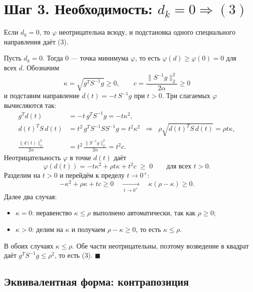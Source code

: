 \documentclass[11pt,a4paper]{article}
\newcommand{\norm}[1]{\lVert #1\rVert_2}
\begin{document}
\section*{Шаг 3. Необходимость: $d_k = 0 \Rightarrow (3)$}

Если $d_k = 0$, то $\varphi$ неотрицательна всюду, и подстановка одного
специального направления даёт (3).

Пусть $d_k = 0$. Тогда $0$ — точка минимума $\varphi$, то есть
$\varphi(d) \ge \varphi(0) = 0$ для всех $d$. Обозначим
\begin{equation*}
\kappa = \sqrt{g^TS^{-1}g} \ge 0, \qquad c = \frac{\norm{S^{-1}g}^2}{2\alpha} \ge 0
\end{equation*}
и подставим направление $d(t) = -t\,S^{-1}g$ при $t > 0$. Три слагаемых $\varphi$
вычисляются так:
\begin{align*}
g^Td(t) &= -t\,g^TS^{-1}g = -t\kappa^2,\\
d(t)^TS\,d(t) &= t^2\,g^TS^{-1}SS^{-1}g = t^2\kappa^2
\;\;\Longrightarrow\;\; \rho\sqrt{d(t)^TS\,d(t)} = \rho t\kappa,\\
\frac{\norm{d(t)}^2}{2\alpha} &= t^2\,\frac{\norm{S^{-1}g}^2}{2\alpha} = t^2c.
\end{align*}
Неотрицательность $\varphi$ в точке $d(t)$ даёт
\begin{equation*}
\varphi(d(t)) = -t\kappa^2 + \rho t\kappa + t^2c \;\ge\; 0
\qquad \text{для всех } t > 0 .
\end{equation*}
Разделим на $t > 0$ и перейдём к пределу $t \to 0^+$:
\begin{equation*}
-\kappa^2 + \rho\kappa + tc \ge 0
\quad\xrightarrow[\;t\to 0^+\;]{}\quad \kappa(\rho - \kappa) \ge 0 .
\end{equation*}
Далее два случая:
\begin{itemize}
\item $\kappa = 0$: неравенство $\kappa \le \rho$ выполнено автоматически, так как
$\rho \ge 0$;
\item $\kappa > 0$: делим на $\kappa$ и получаем $\rho - \kappa \ge 0$, то есть
$\kappa \le \rho$.
\end{itemize}
В обоих случаях $\kappa \le \rho$. Обе части неотрицательны, поэтому возведение в
квадрат даёт \mbox{$g^TS^{-1}g \le \rho^2$}, то есть (3). \hfill $\blacksquare$

\subsection*{Эквивалентная форма: контрапозиция}
\end{document}
